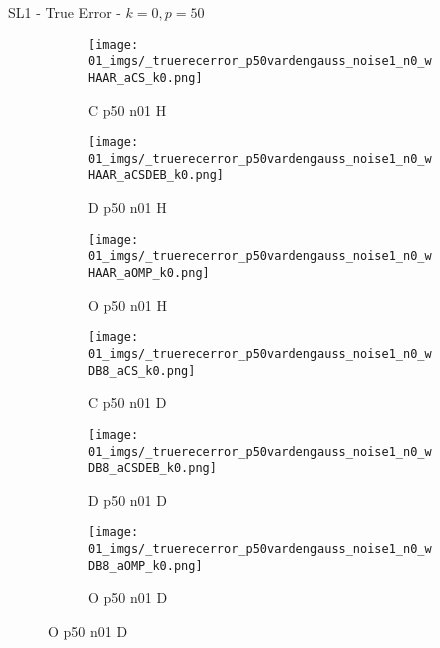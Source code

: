\begin{frame}{SL1 - True Error - $k=0,p=50$}{}
\begin{figure}
\begin{subfigure}{0.13\textwidth}
\texttt{[image: 01\_imgs/\_truerecerror\_p50vardengauss\_noise1\_n0\_wHAAR\_aCS\_k0.png]}
\caption*{\tiny C p50 n01 H}
\end{subfigure}
\begin{subfigure}{0.13\textwidth}
\texttt{[image: 01\_imgs/\_truerecerror\_p50vardengauss\_noise1\_n0\_wHAAR\_aCSDEB\_k0.png]}
\caption*{\tiny D p50 n01 H}
\end{subfigure}
\begin{subfigure}{0.13\textwidth}
\texttt{[image: 01\_imgs/\_truerecerror\_p50vardengauss\_noise1\_n0\_wHAAR\_aOMP\_k0.png]}
\caption*{\tiny O p50 n01 H}
\end{subfigure}
\begin{subfigure}{0.13\textwidth}
\texttt{[image: 01\_imgs/\_truerecerror\_p50vardengauss\_noise1\_n0\_wDB8\_aCS\_k0.png]}
\caption*{\tiny C p50 n01 D}
\end{subfigure}
\begin{subfigure}{0.13\textwidth}
\texttt{[image: 01\_imgs/\_truerecerror\_p50vardengauss\_noise1\_n0\_wDB8\_aCSDEB\_k0.png]}
\caption*{\tiny D p50 n01 D}
\end{subfigure}
\begin{subfigure}{0.13\textwidth}
\texttt{[image: 01\_imgs/\_truerecerror\_p50vardengauss\_noise1\_n0\_wDB8\_aOMP\_k0.png]}
\caption*{\tiny O p50 n01 D}
\end{subfigure}

\vspace{5pt}


\end{figure}
\end{frame}
